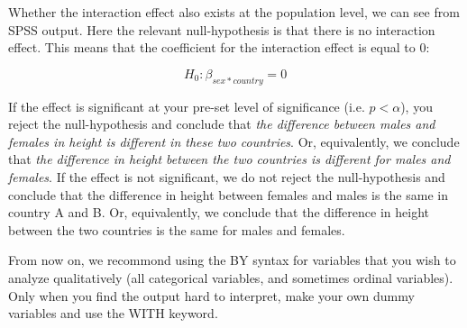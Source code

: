 \begin{knitrout}
\color{fgcolor}\begin{kframe}


{\ttfamily\noindent\bfseries{}}\end{kframe}
\end{knitrout}


Whether the interaction effect also exists at the population level, we can see from SPSS output. Here the relevant null-hypothesis is that there is no interaction effect. This means that the coefficient for the interaction effect is equal to 0:


\begin{equation}
H_0: \beta_{sex*country}=0
\end{equation}

If the effect is significant at your pre-set level of significance (i.e. $p < \alpha$), you reject the null-hypothesis and conclude that \textit{the difference between males and females in height is different in these two countries}. Or, equivalently, we conclude that \textit{the difference in height between the two countries is different for males and females}. If the effect is not significant, we do not reject the null-hypothesis and conclude that the difference in height between females and males is the same in country A and B. Or, equivalently, we conclude that the difference in height between the two countries is the same for males and females.




From now on, we recommond using the BY syntax for variables that you wish to analyze qualitatively (all categorical variables, and sometimes ordinal variables). Only when you find the output hard to interpret, make your own dummy variables and use the WITH keyword.





